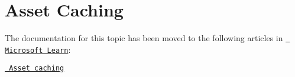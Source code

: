 \chapter{Asset Caching}
\hypertarget{md_external_2reflect-cpp_2vcpkg_2docs_2users_2assetcaching}{}\label{md_external_2reflect-cpp_2vcpkg_2docs_2users_2assetcaching}
\label{md_external_2reflect-cpp_2vcpkg_2docs_2users_2assetcaching_autotoc_md757}%
%


The documentation for this topic has been moved to the following articles in \href{https://learn.microsoft.com/vcpkg}{\texttt{ Microsoft Learn}}\+:


\begin{DoxyItemize}
\item \href{https://learn.microsoft.com/vcpkg/users/assetcaching}{\texttt{ Asset caching}} 
\end{DoxyItemize}